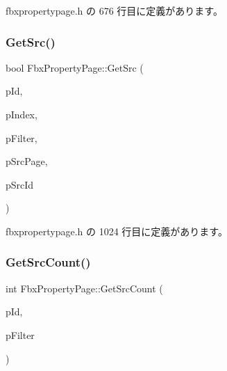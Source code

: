  fbxpropertypage.\+h の 676 行目に定義があります。

\mbox{\label{class_fbx_property_page_aafbff3be58063db0f4c08fc020ad5eb8}} 
\subsubsection{\texorpdfstring{Get\+Src()}{GetSrc()}}
{\footnotesize\ttfamily bool Fbx\+Property\+Page\+::\+Get\+Src (\begin{DoxyParamCaption}\item[{\hyperlink{fbxtypes_8h_a088fa96de3b0b3ea69f0f6afef525dfb}{Fbx\+Int}}]{p\+Id,  }\item[{int}]{p\+Index,  }\item[{\hyperlink{class_fbx_connection_point_filter}{Fbx\+Connection\+Point\+Filter} $\ast$}]{p\+Filter,  }\item[{\hyperlink{class_fbx_property_page}{Fbx\+Property\+Page} $\ast$$\ast$}]{p\+Src\+Page,  }\item[{\hyperlink{fbxtypes_8h_a088fa96de3b0b3ea69f0f6afef525dfb}{Fbx\+Int} $\ast$}]{p\+Src\+Id }\end{DoxyParamCaption})\hspace{0.3cm}{\ttfamily [inline]}}



 fbxpropertypage.\+h の 1024 行目に定義があります。

\mbox{\label{class_fbx_property_page_ab9dd61db9684b52c7216cf437ef305dc}} 
\subsubsection{\texorpdfstring{Get\+Src\+Count()}{GetSrcCount()}}
{\footnotesize\ttfamily int Fbx\+Property\+Page\+::\+Get\+Src\+Count (\begin{DoxyParamCaption}\item[{\hyperlink{fbxtypes_8h_a088fa96de3b0b3ea69f0f6afef525dfb}{Fbx\+Int}}]{p\+Id,  }\item[{\hyperlink{class_fbx_connection_point_filter}{Fbx\+Connection\+Point\+Filter} $\ast$}]{p\+Filter }\end{DoxyParamCaption})\hspace{0.3cm}{\ttfamily [inline]}}



